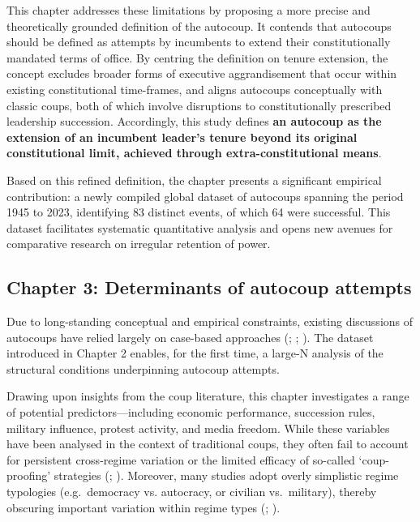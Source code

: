 \documentclass[
  12pt,
]{report}
\begin{document}
This chapter addresses these limitations by proposing a more precise and
theoretically grounded definition of the autocoup. It contends that
autocoups should be defined as attempts by incumbents to extend their
constitutionally mandated terms of office. By centring the definition on
tenure extension, the concept excludes broader forms of executive
aggrandisement that occur within existing constitutional time-frames,
and aligns autocoups conceptually with classic coups, both of which
involve disruptions to constitutionally prescribed leadership
succession. Accordingly, this study defines \textbf{an autocoup as the
extension of an incumbent leader's tenure beyond its original
constitutional limit, achieved through extra-constitutional means}.

Based on this refined definition, the chapter presents a significant
empirical contribution: a newly compiled global dataset of autocoups
spanning the period 1945 to 2023, identifying 83 distinct events, of
which 64 were successful. This dataset facilitates systematic
quantitative analysis and opens new avenues for comparative research on
irregular retention of power.

\subsection*{Chapter 3: Determinants of autocoup
attempts}\label{chapter-3-determinants-of-autocoup-attempts}

Due to long-standing conceptual and empirical constraints, existing
discussions of autocoups have relied largely on case-based approaches
(;
;
). The dataset
introduced in Chapter 2 enables, for the first time, a large-N analysis
of the structural conditions underpinning autocoup attempts.

Drawing upon insights from the coup literature, this chapter
investigates a range of potential predictors---including economic
performance, succession rules, military influence, protest activity, and
media freedom. While these variables have been analysed in the context
of traditional coups, they often fail to account for persistent
cross-regime variation or the limited efficacy of so-called
`coup-proofing' strategies (; ). Moreover, many studies
adopt overly simplistic regime typologies (e.g.~democracy vs. autocracy,
or civilian vs.~military), thereby obscuring important variation within
regime types (;
).
\end{document}
